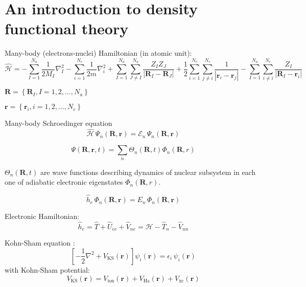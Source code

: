 \chapter{An introduction to density functional theory}

Many-body (electrons-nuclei) Hamiltonian (in atomic unit):
\begin{equation}
\hat{\mathcal{H}} = 
- \sum_{I=1}^{N_{a}} \frac{1}{2M_{I}} \nabla^{2}_{I}
- \sum_{i=1}^{N_{e}} \frac{1}{2m} \nabla^{2}_{i}
+ \sum_{I=1}^{N_{a}} \sum_{J \neq I}^{N_{a}} \frac{Z_{I} Z_{J}}{\left| \mathbf{R}_{I} - \mathbf{R}_{J} \right|}
+ \frac{1}{2} \sum_{i=1}^{N_{e}} \sum_{j \neq i}^{N_{e}} \frac{1}{\left| \mathbf{r}_{i} - \mathbf{r}_{j} \right|}
- \sum_{I=1}^{N_{a}} \sum_{i \neq i}^{N_{e}} \frac{Z_{I}}{\left| \mathbf{R}_{I} - \mathbf{r}_{i} \right|}
\end{equation}

$\mathbf{R} = \left\{ \mathbf{R}_{I}, I=1,2,\ldots,N_{a} \right\}$

$\mathbf{r} = \left\{ \mathbf{r}_{i}, i=1,2,\ldots,N_{e} \right\}$


Many-body Schroedinger equation
\begin{equation}
\hat{\mathcal{H}}\, \Psi_{n}(\mathbf{R},\mathbf{r}) = \mathcal{E}_{n}\, \Psi_{n}(\mathbf{R},\mathbf{r})
\end{equation}


\begin{equation}
\Psi(\mathbf{R},\mathbf{r},t) = \sum_{n} \Theta_{n}(\mathbf{R},t) \Phi_{n}(\mathbf{R},r)
\end{equation}


$\Theta_{n}(\mathbf{R},t)$ are wave functions describing dynamics of nuclear subsystem in each one of
adiabatic electronic eigenstates $\Phi_{n} (\mathbf{R},r)$.

\begin{equation}
\hat{h}_{e} \, \Phi_{n}(\mathbf{R},\mathbf{r}) = E_{n}\,\Phi_{n}(\mathbf{R},\mathbf{r})
\end{equation}

Electronic Hamiltonian:
\begin{equation}
\hat{h}_{e} = \hat{T} + \hat{U}_{ee} + \hat{V}_{ne} = \mathcal{H} - \hat{T}_{n} - \hat{V}_{nn}
\end{equation}




Kohn-Sham equation \cite{Kohn1965} :
\begin{equation}
\left[ -\frac{1}{2}\nabla^2 + V_{\mathrm{KS}}(\mathbf{r})\right]
\psi_{i}(\mathbf{r}) = \epsilon_{i} \, \psi_{i}(\mathbf{r})
\end{equation}
with Kohn-Sham potential:
\begin{equation}
V_{\mathrm{KS}}(\mathbf{r}) = V_{\mathrm{ion}}(\mathbf{r}) +
V_{\mathrm{Ha}}(\mathbf{r}) + V_{\mathrm{xc}}(\mathbf{r})
\end{equation}

